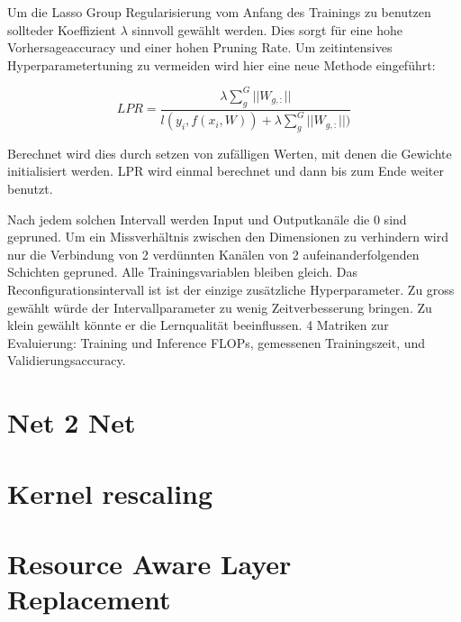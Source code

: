 Um die Lasso Group Regularisierung vom Anfang des Trainings zu benutzen sollteder Koeffizient $\lambda$ sinnvoll gewählt werden. Dies sorgt für eine hohe Vorhersageaccuracy und einer hohen Pruning Rate. Um zeitintensives Hyperparametertuning zu vermeiden wird hier eine neue Methode eingeführt:
 
 $$LPR=\frac{\lambda \sum_{g}^{G}|| W_{g,:} ||}{l(y_i,f(x_i,W))+\lambda \sum_{g}^{G}||W_{g,:} ||)} $$
 
 Berechnet wird dies durch setzen von zufälligen Werten, mit denen die Gewichte initialisiert werden. LPR wird einmal berechnet und dann bis zum Ende weiter benutzt.

 
 Nach jedem solchen Intervall werden Input und Outputkanäle die 0 sind gepruned. Um ein Missverhältnis zwischen den Dimensionen zu verhindern wird nur die Verbindung von 2 verdünnten Kanälen von 2 aufeinanderfolgenden Schichten gepruned. Alle Trainingsvariablen bleiben gleich.
 Das Reconfigurationsintervall ist ist der einzige zusätzliche Hyperparameter. Zu gross gewählt würde der Intervallparameter zu wenig Zeitverbesserung bringen. Zu klein gewählt könnte er die Lernqualität beeinflussen.
4 Matriken zur Evaluierung: Training und Inference FLOPs, gemessenen Trainingszeit, und Validierungsaccuracy. 




\section{Net 2 Net}


\section{Kernel rescaling}


\section{Resource Aware Layer Replacement}
